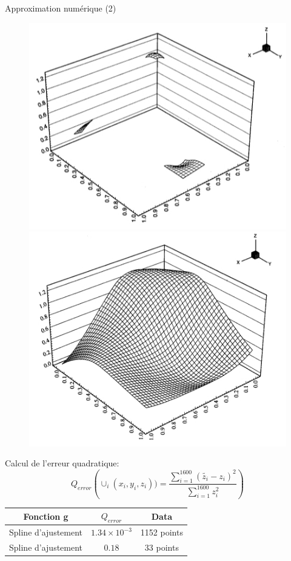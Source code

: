 \documentclass[final]{beamer}
\newlength{\onecolwid}
\newlength{\twocolwid}
\begin{document}
\begin{frame}[t]
\begin{columns}[t]
\begin{column}{\twocolwid}
\begin{columns}[t,totalwidth=\twocolwid]
\begin{column}{\onecolwid}\vspace{-.6in} %
\begin{block}{Approximation numérique (2)}
\begin{figure}[!h]
\centering
\includegraphics[scale=1.2]{CGOUT5.jpg}
\includegraphics[scale=1.2]{CGOUT3.jpg}
\end{figure}
Calcul de l'erreur quadratique:
\[Q_{error}(\cup_{i}{(x_i,y_i,z_i))}=\frac{\sum_{i=1}^{1600}{(\tilde{z_i}-z_i)^2}}{\sum_{i=1}^{1600}{z_i^2}}) \]
\begin{center}
\begin{tabular}{|c|c|c|}
\hline
Fonction g & $Q_{error}$ & Data \\
\hline
Spline d'ajustement & $1.34\times10^{-3}$ & 1152 points \\
\hline
Spline d'ajustement & $0.18$ & 33 points \\
\hline
\end{tabular}
\end{center}


\end{block}
\end{column}
\end{columns}
\end{column}
\end{columns}
\end{frame}
\end{document}
